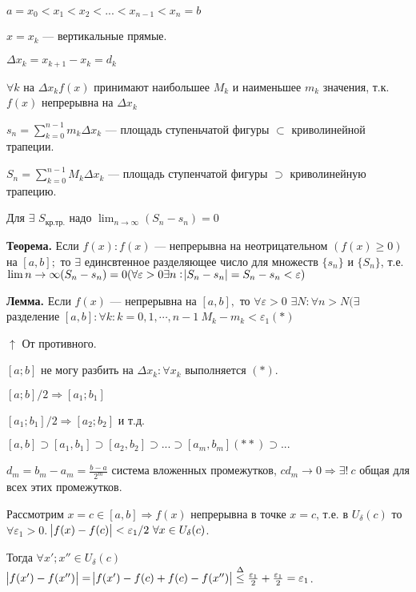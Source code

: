 \documentclass{article}
\begin{document}
    \(a = x_0 < x_1 < x_2 < ... < x_{n-1} < x_n = b\)

    \(x = x_k\) --- вертикальные прямые.
    
    \(\Delta x_k = x_{k+1} - x_k = d_k\)
    
    \(\forall k\) на \(\Delta x_k f(x)\) принимают наибольшее \(M_k\) и наименьшее \(m_k\) значения, т.к. \(f(x)\) непрерывна на \(\Delta x_k\)
    
    \(s_n = \sum_{k=0}^{n-1} m_k\Delta x_k\) --- площадь ступеньчатой фигуры \(\subset\) криволинейной трапеции.
    
    \(S_n = \sum_{k=0}^{n-1} M_k\Delta x_k\) --- площадь ступенчатой фигуры \(\supset\) криволинейную трапецию.
    
    Для \(\exists\) \(S_{\textrm{кр.тр.}}\) надо \(\lim_{n \to \infty}(S_n - s_n) = 0\)
    
    \textbf{Теорема.} Если \(f(x): f(x)\) --- непрерывна на неотрицательном \((f(x) \geq 0)\) на \([a, b];\) то \(\exists\) единсвтенное разделяющее число для множеств \(\{s_n\}\) и $\{S_n\}$, т.е. \(\lim{n \to \infty}(S_n-s_n) = 0(\forall \varepsilon > 0 \exists n : \abs{S_n-s_n} = S_n - s_n < \varepsilon)\)

    
    \textbf{Лемма.} Если \(f(x)\) --- непрерывна на \([a, b],\) то \(\forall \varepsilon > 0\) \(\exists N: \forall n > N (\exists\) разделение \([a, b]: \forall k: k = 0,1,\cdots,n-1  \  M_k - m_k < \varepsilon_1 (*)\)
    
    \(\uparrow\) От противного.

    \([a;b]\) не могу разбить на \(\Delta x_k : \forall x_k\) выполняется \((*)\).
    
    \([a;b]/2 \Rightarrow [a_1;b_1]\)

    \([a_1;b_1]/2 \Rightarrow [a_2;b_2]\) и т.д.

    \([a, b] \supset [a_1, b_1] \supset [a_2, b_2] \supset ... \supset [a_m, b_m](**) \supset ...\)

    \( d_m = b_m - a_m = \frac{b-a}{2^m}\)
    система вложенных промежутков, \(c d_m \to 0 \Rightarrow \exists !\ c\) общая для всех этих промежутков.
    
    Рассмотрим \( x = c \in [a,b] \Rightarrow f(x)\) непрерывна в точке \(x = c\), т.е. в \(U_{\delta}(c)\) то \(\forall \varepsilon_1 > 0\). \(\abs{f(x)-f(c)} < \varepsilon_1/2\ \forall x \in U_\delta(c)\).
    
    Тогда \(\forall x';x'' \in U_{\delta}(c)\)
    \(\abs{f(x')-f(x'')} = \abs{f(x') - f(c) + f(c) - f(x'')} \overset{\Delta}{\leq} \frac{\varepsilon_1}{2} + \frac{\varepsilon_1}{2} = \varepsilon_1\).
\end{document}
